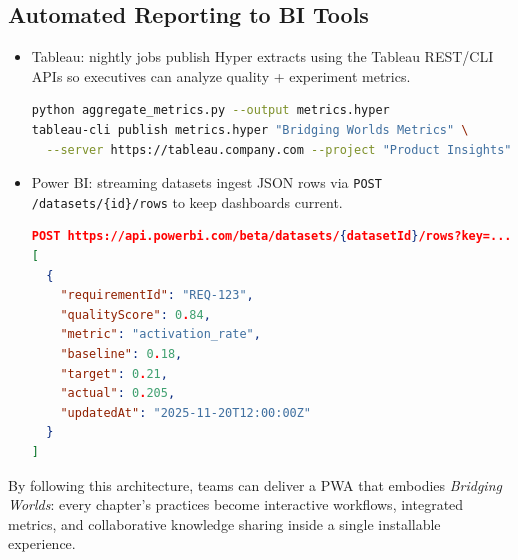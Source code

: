 \subsection{Automated Reporting to BI Tools}
\begin{itemize}
    \item Tableau: nightly jobs publish Hyper extracts using the Tableau REST/CLI APIs so executives can analyze quality + experiment metrics.
\begin{lstlisting}[language=bash]
python aggregate_metrics.py --output metrics.hyper
tableau-cli publish metrics.hyper "Bridging Worlds Metrics" \
  --server https://tableau.company.com --project "Product Insights"
\end{lstlisting}
    \item Power BI: streaming datasets ingest JSON rows via \texttt{POST /datasets/\{id\}/rows} to keep dashboards current.
\begin{lstlisting}[language=json]
POST https://api.powerbi.com/beta/datasets/{datasetId}/rows?key=...
[
  {
    "requirementId": "REQ-123",
    "qualityScore": 0.84,
    "metric": "activation_rate",
    "baseline": 0.18,
    "target": 0.21,
    "actual": 0.205,
    "updatedAt": "2025-11-20T12:00:00Z"
  }
]
\end{lstlisting}
\end{itemize}

By following this architecture, teams can deliver a PWA that embodies \textit{Bridging Worlds}: every chapter’s practices become interactive workflows, integrated metrics, and collaborative knowledge sharing inside a single installable experience.
